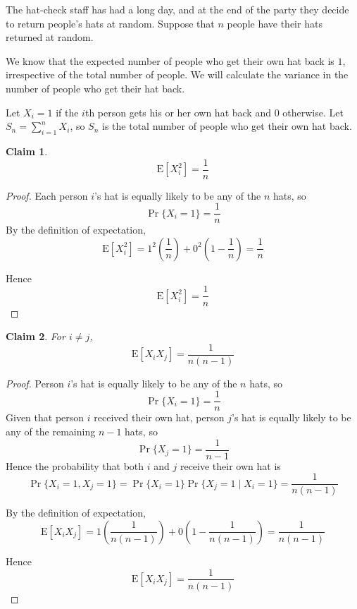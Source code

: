 \documentclass{article}
\newtheorem{claim}{Claim}
\begin{document}
The hat-check staff has had a long day, and at the end of the party they decide to return people's hats 
at random. Suppose that $n$ people have their hats returned at random. 

\medskip

We know that the expected number of people who get their own hat back is $1$, irrespective of the total 
number of people. We will calculate the variance in the number of people who get their hat back.

\medskip

Let $X_i = 1$ if the $i$th person gets his or her own hat back and $0$ otherwise. Let 
$S_n = \sum_{i=1}^{n}X_i$, so $S_n$ is the total number of people who get their own hat back.

\begin{claim}
    \[
    \mathrm{E}[X_i^2] = \frac{1}{n}
    \]
\end{claim}

\begin{proof}
    Each person $i$'s hat is equally likely to be any of the $n$ hats, so
    \[
    \Pr\{X_i = 1\} = \frac{1}{n}
    \]
    By the definition of expectation,
    \[
    \mathrm{E}[X_i^2] = 1^2\left(\frac{1}{n}\right) + 0^2\left(1 - \frac{1}{n}\right) = \frac{1}{n}
    \]

    \medskip

    Hence 
    \[
    \mathrm{E}[X_i^2] = \frac{1}{n}
    \]
\end{proof}

\begin{claim}
    For $i \neq j$,
    \[
    \mathrm{E}[X_iX_j] = \frac{1}{n(n-1)}
    \]
\end{claim}

\begin{proof}
    Person $i$'s hat is equally likely to be any of the $n$ hats, so
    \[
    \Pr\{X_i = 1\} = \frac{1}{n}
    \]
    Given that person $i$ received their own hat, person $j$'s hat is equally likely to be any of the 
    remaining $n-1$ hats, so
    \[
    \Pr\{X_j = 1\} = \frac{1}{n-1}
    \]
    Hence the probability that both $i$ and $j$ receive their own hat is
    \[
    \Pr\{X_i = 1, X_j = 1\} = \Pr\{X_i = 1\}\Pr\{X_j = 1 \mid X_i = 1\} = \frac{1}{n(n-1)}
    \]

    \medskip

    By the definition of expectation,
    \[
    \mathrm{E}[X_iX_j] = 1\left(\frac{1}{n(n-1)}\right) + 0\left(1 - \frac{1}{n(n-1)}\right) 
    = \frac{1}{n(n-1)}
    \]
    
    \medskip

    Hence 
    \[
    \mathrm{E}[X_iX_j] = \frac{1}{n(n-1)}
    \]
\end{proof}
\end{document}
